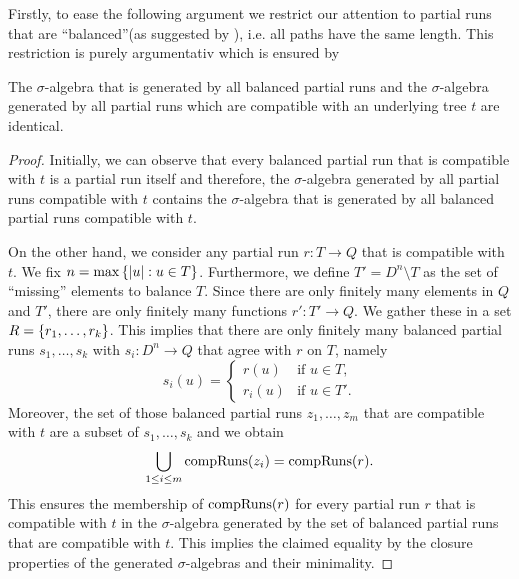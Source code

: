 Firstly, to ease the following argument we restrict our attention to partial 
runs that are \enquote{balanced}(as suggested by 
\cite[Remark 35]{RandAutoInfTrees}), i.e. all paths have the same length. 
This restriction is purely argumentativ which is ensured by
\begin{lemma}
  The $\sigma$-algebra that is generated by all balanced partial runs and the 
  $\sigma$-algebra generated by all partial runs which are compatible with an
  underlying tree $t$ are identical.
  \label{lem:balancedruns}
\end{lemma}
\begin{proof}
  Initially, we can observe that every balanced partial run that is compatible
  with $t$ is a partial run itself and therefore, the $\sigma$-algebra
  generated by all partial runs compatible with $t$ contains the
  $\sigma$-algebra that is generated by all balanced partial runs compatible
  with $t$.

  On the other hand, we consider any partial run $r:T\rightarrow Q$ that is
  compatible with $t$. We fix $n = \max\left\{\left\vert{u}\right\vert:u\in T\right\}$. Furthermore, we
  define $T' = D^{n}\setminus T$ as the set of \enquote{missing} elements to
  balance $T$. Since there are only finitely many elements in $Q$ and $T'$,
  there are only finitely many functions $r':T'\rightarrow Q$. We gather these
  in a set $R = \left\{r_{1}, \dots, r_{k}\right\}$. This implies that there are only
  finitely many balanced partial runs $s_{1}, \dots, s_{k}$ with 
  $s_{i}:D^{n}\rightarrow Q$ that agree with $r$ on $T$, namely
  \begin{equation*}
    s_{i}(u) = \begin{cases}
      r(u)&\text{if }u\in T,\\
      r_{i}(u)&\text{if }u\in T'.
    \end{cases}
  \end{equation*}
  Moreover, the set of those balanced partial runs $z_{1}, \dots, z_{m}$ that 
  are compatible with $t$ are a subset of $s_{1}, \dots, s_{k}$ and we obtain
  \begin{equation*}
    \bigcup_{1\leq i\leq m}\operatorname{compRuns}(z_{i}) = \operatorname{compRuns}(r).
  \end{equation*}
  This ensures the membership of $\operatorname{compRuns}(r)$ for every partial run $r$ that
  is compatible with $t$ in the $\sigma$-algebra generated by the set of
  balanced partial runs that are compatible with $t$. This implies the claimed
  equality by the closure properties of the generated $\sigma$-algebras and
  their minimality.
\end{proof}

